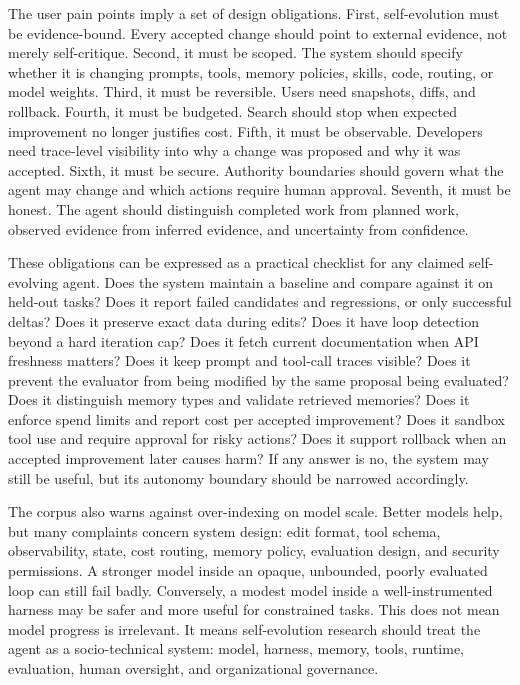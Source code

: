 The user pain points imply a set of design obligations. First, self-evolution must be evidence-bound. Every accepted change should point to external evidence, not merely self-critique. Second, it must be scoped. The system should specify whether it is changing prompts, tools, memory policies, skills, code, routing, or model weights. Third, it must be reversible. Users need snapshots, diffs, and rollback. Fourth, it must be budgeted. Search should stop when expected improvement no longer justifies cost. Fifth, it must be observable. Developers need trace-level visibility into why a change was proposed and why it was accepted. Sixth, it must be secure. Authority boundaries should govern what the agent may change and which actions require human approval. Seventh, it must be honest. The agent should distinguish completed work from planned work, observed evidence from inferred evidence, and uncertainty from confidence.

These obligations can be expressed as a practical checklist for any claimed self-evolving agent. Does the system maintain a baseline and compare against it on held-out tasks? Does it report failed candidates and regressions, or only successful deltas? Does it preserve exact data during edits? Does it have loop detection beyond a hard iteration cap? Does it fetch current documentation when API freshness matters? Does it keep prompt and tool-call traces visible? Does it prevent the evaluator from being modified by the same proposal being evaluated? Does it distinguish memory types and validate retrieved memories? Does it enforce spend limits and report cost per accepted improvement? Does it sandbox tool use and require approval for risky actions? Does it support rollback when an accepted improvement later causes harm? If any answer is no, the system may still be useful, but its autonomy boundary should be narrowed accordingly.

The corpus also warns against over-indexing on model scale. Better models help, but many complaints concern system design: edit format, tool schema, observability, state, cost routing, memory policy, evaluation design, and security permissions. A stronger model inside an opaque, unbounded, poorly evaluated loop can still fail badly. Conversely, a modest model inside a well-instrumented harness may be safer and more useful for constrained tasks. This does not mean model progress is irrelevant. It means self-evolution research should treat the agent as a socio-technical system: model, harness, memory, tools, runtime, evaluation, human oversight, and organizational governance.

